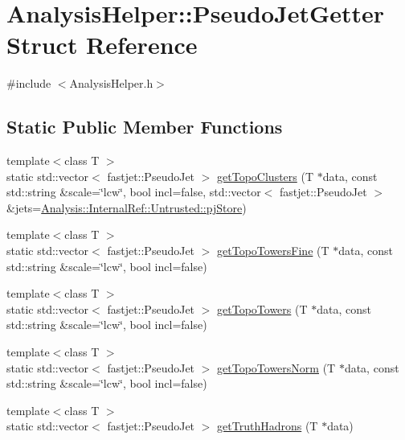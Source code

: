 \hypertarget{structAnalysisHelper_1_1PseudoJetGetter}{}\section{Analysis\+Helper\+:\+:Pseudo\+Jet\+Getter Struct Reference}
\label{structAnalysisHelper_1_1PseudoJetGetter}


{\ttfamily \#include $<$Analysis\+Helper.\+h$>$}

\subsection*{Static Public Member Functions}
\begin{DoxyCompactItemize}
\item 
{\footnotesize template$<$class T $>$ }\\static std\+::vector$<$ fastjet\+::\+Pseudo\+Jet $>$ \hyperlink{structAnalysisHelper_1_1PseudoJetGetter_ab09760ad8a820ebd84dd86ab4908b78d}{get\+Topo\+Clusters} (T $\ast$data, const std\+::string \&scale=\char`\"{}lcw\char`\"{}, bool incl=false, std\+::vector$<$ fastjet\+::\+Pseudo\+Jet $>$ \&jets=\hyperlink{namespaceAnalysis_1_1InternalRef_1_1Untrusted_af67827e0785b8a3fc082a287e1a03f14}{Analysis\+::\+Internal\+Ref\+::\+Untrusted\+::pj\+Store})
\item 
{\footnotesize template$<$class T $>$ }\\static std\+::vector$<$ fastjet\+::\+Pseudo\+Jet $>$ \hyperlink{structAnalysisHelper_1_1PseudoJetGetter_a579d671c702b1d0a348983e38d64912c}{get\+Topo\+Towers\+Fine} (T $\ast$data, const std\+::string \&scale=\char`\"{}lcw\char`\"{}, bool incl=false)
\item 
{\footnotesize template$<$class T $>$ }\\static std\+::vector$<$ fastjet\+::\+Pseudo\+Jet $>$ \hyperlink{structAnalysisHelper_1_1PseudoJetGetter_afebd4a14f9faeb91b2009d889f648d36}{get\+Topo\+Towers} (T $\ast$data, const std\+::string \&scale=\char`\"{}lcw\char`\"{}, bool incl=false)
\item 
{\footnotesize template$<$class T $>$ }\\static std\+::vector$<$ fastjet\+::\+Pseudo\+Jet $>$ \hyperlink{structAnalysisHelper_1_1PseudoJetGetter_aaf0957a5ef4a1de8c1c2a80886f7b775}{get\+Topo\+Towers\+Norm} (T $\ast$data, const std\+::string \&scale=\char`\"{}lcw\char`\"{}, bool incl=false)
\item 
{\footnotesize template$<$class T $>$ }\\static std\+::vector$<$ fastjet\+::\+Pseudo\+Jet $>$ \hyperlink{structAnalysisHelper_1_1PseudoJetGetter_a06e4ca18950b8fd4ae2da0be3cc405ee}{get\+Truth\+Hadrons} (T $\ast$data)

\end{DoxyCompactItemize}
